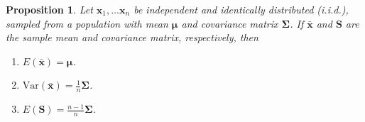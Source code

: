 \documentclass[]{book}
\newtheorem{proposition}{Proposition}[chapter]
\theoremstyle{definition}
\theoremstyle{definition}
\theoremstyle{definition}
\theoremstyle{remark}
\begin{document}
\begin{proposition}
\protect\hypertarget{prp:unnamed-chunk-9}{}{\label{prp:unnamed-chunk-9} }Let \(\boldsymbol x_1, \ldots \boldsymbol x_n\) be independent and identically distributed (i.i.d.), sampled from a population with mean \(\boldsymbol \mu\) and covariance matrix \(\boldsymbol \Sigma\). If \(\bar{\boldsymbol x}\) and \(\boldsymbol S\) are the sample mean and covariance matrix, respectively, then

\begin{enumerate}
\def\labelenumi{\arabic{enumi}.}
\item
  \(E(\bar{\boldsymbol x}) = \boldsymbol \mu\).
\item
  \(\text{Var}(\bar{\boldsymbol x}) = {\displaystyle\frac{1}{n}} \boldsymbol \Sigma\).
\item
  \(E(\boldsymbol S) = {\displaystyle\frac{n-1}{n}} \boldsymbol \Sigma\).
\end{enumerate}
\end{proposition}
\end{document}
